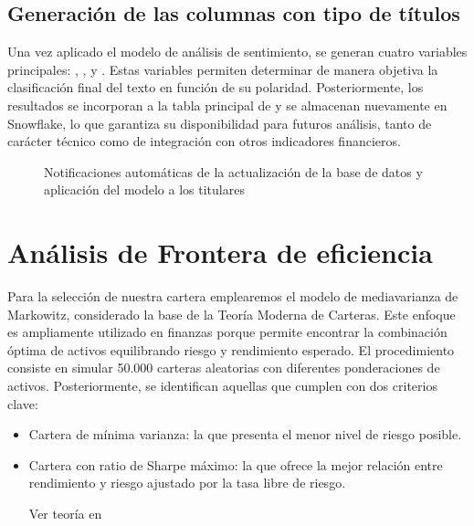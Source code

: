 \documentclass[letterpaper,10pt,spanish]{sphinxmanual}
\begin{document}
\subsection{Generación de las columnas con tipo de títulos}
\label{\detokenize{AutomatizacionFinanciera:generacion-de-las-columnas-con-tipo-de-titulos}}
\sphinxAtStartPar
Una vez aplicado el modelo de análisis de sentimiento, se generan cuatro variables principales: , ,  y . Estas variables permiten determinar de manera objetiva la clasificación final del texto en función de su polaridad. Posteriormente, los resultados se incorporan a la tabla principal de  y se almacenan nuevamente en Snowflake, lo que garantiza su disponibilidad para futuros análisis, tanto de carácter técnico como de integración con otros indicadores financieros.

\begin{figure}[htbp]
\centering
\capstart

\noindent{}
\caption{ Notificaciones automáticas de la actualización de la base de datos y aplicación del modelo a los titulares}\label{\detokenize{AutomatizacionFinanciera:id3}}\end{figure}


\section{Análisis  de Frontera de eficiencia}
\label{\detokenize{AutomatizacionFinanciera:analisis-de-frontera-de-eficiencia}}
\sphinxAtStartPar
Para la selección de nuestra cartera emplearemos el modelo de media\sphinxhyphen{}varianza de Markowitz, considerado la base de la Teoría Moderna de Carteras. Este enfoque es ampliamente utilizado en finanzas porque permite encontrar la combinación óptima de activos equilibrando riesgo y rendimiento esperado.
El procedimiento consiste en simular 50.000 carteras aleatorias con diferentes ponderaciones de activos. Posteriormente, se identifican aquellas que cumplen con dos criterios clave:
\begin{itemize}
\item {} 
\sphinxAtStartPar
Cartera de mínima varianza: la que presenta el menor nivel de riesgo posible.

\item {} 
\sphinxAtStartPar
Cartera con ratio de Sharpe máximo: la que ofrece la mejor relación entre rendimiento y riesgo ajustado por la tasa libre de riesgo.

\sphinxAtStartPar
Ver teoría en {\hyperref[\detokenize{MarcoTeorico:modelo-de-markowitz}]{}}

\end{itemize}
\end{document}
